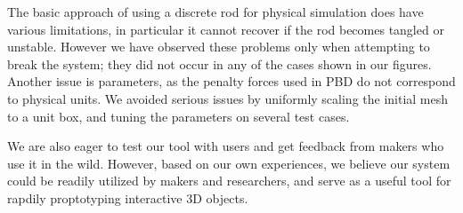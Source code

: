 The basic approach of using a discrete rod for physical simulation does have various limitations, in particular it
cannot recover if the rod becomes tangled or unstable. 
However we have observed these problems only when attempting to break
the system; they did not occur in any of the cases shown in our figures.
Another issue is parameters, as the penalty forces used in PBD do not
correspond to physical units. We avoided serious issues by uniformly
scaling the initial mesh to a unit box, and tuning the parameters on several test cases.

We are also eager to test our tool with users and get feedback from makers who use it in the wild. However, based on our own experiences, we believe our system could be readily utilized by makers and researchers, and serve as a useful tool for rapdily proptotyping interactive 3D objects.
